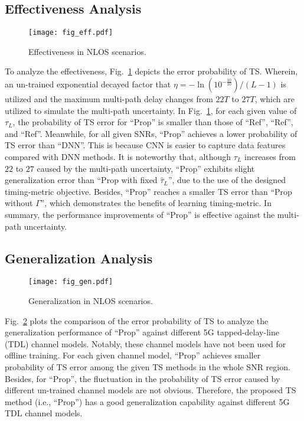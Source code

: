 \documentclass[conference]{IEEEtran}
\begin{document}
\subsection{Effectiveness Analysis}
\begin{figure}[t]
\vspace{-3mm}
  \centering
  \texttt{[image: fig\_eff.pdf]}\\\vspace{-3mm}
  \caption{Effectiveness in NLOS scenarios.}\label{fig:eff}\vspace{-4mm}
\end{figure}
To analyze the effectiveness, Fig.~\ref{fig:eff} depicts the error probability of TS. Wherein, an un-trained exponential decayed factor that $\eta=-\ln(10^{-\frac{10}{10}})/(L-1)$\cite{ref:Ch1} is utilized and the maximum multi-path delay changes from $22T$ to $27T$, which are utilized to simulate the multi-path uncertainty.
In Fig.~\ref{fig:eff}, for each given value of $\tau_L$, the probability of TS error for ``Prop'' is smaller than those of ``Ref\cite{ref:CTS}'', ``Ref\cite{ref:JSandCE}'', and ``Ref\cite{ref:ELM-labelTS}''. Meanwhile, for all given SNRs, ``Prop'' achieves a lower probability of TS error than ``DNN''. This is because CNN is easier to capture data features compared with DNN methods. It is noteworthy that, although $\tau_L$ increases from $22$ to $27$ caused by the multi-path uncertainty, ``Prop'' exhibits slight generalization error than ``Prop with fixed $\hat\tau_L$'', due to the use of the designed timing-metric objective.
Besides, ``Prop'' reaches a smaller TS error than ``Prop without $\Gamma$'', which demonstrates the benefits of learning timing-metric.
In summary, the performance improvements of ``Prop'' is effective against the multi-path uncertainty.\vspace{-2mm}
\subsection{Generalization Analysis}
\begin{figure}[t]
\vspace{-1mm}
  \centering
  \texttt{[image: fig\_gen.pdf]}\\\vspace{-3mm}
  \caption{Generalization in NLOS scenarios.}\label{fig:gen}\vspace{-3mm}
\end{figure}
Fig.~\ref{fig:gen} plots the comparison of the error probability of TS to analyze the generalization performance of ``Prop'' against different 5G tapped-delay-line (TDL) channel models\cite{ref:3GPP5G}.
Notably, these channel models have not been used for offline training.
For each given channel model, ``Prop'' achieves smaller probability of TS error among the given TS methods in the whole SNR region.
Besides, for ``Prop'', the fluctuation in the probability of TS error caused by different un-trained channel models are not obvious.
Therefore, the proposed TS method (i.e., ``Prop'') has a good generalization capability against different 5G TDL channel models.
\vspace{-2mm}
\end{document}
